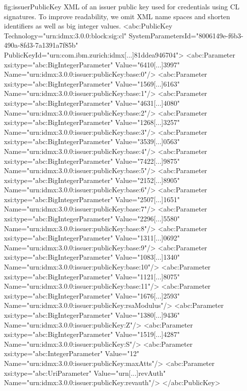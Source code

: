 \begin{xml}
{fig:issuerPublicKey}
{XML of an issuer public key used for credentials using CL signatures. To improve readability, we omit 
XML name spaces and shorten identifiers as well as big integer values.}
<abc:PublicKey 
    Technology="urn:idmx:3.0.0:block:sig:cl" 
    SystemParametersId="8006149e-f6b3-490a-8fd3-7a1391a7f85b" 
    PublicKeyId="urn:com.ibm.zurich:idmx[...]81ddea946704">
  <abc:Parameter xsi:type="abc:BigIntegerParameter" Value="6410[...]3997" 
    Name="urn:idmx:3.0.0:issuer:publicKey:base:0"/>
  <abc:Parameter xsi:type="abc:BigIntegerParameter" Value="1569[...]6163" 
    Name="urn:idmx:3.0.0:issuer:publicKey:base:1"/>
  <abc:Parameter xsi:type="abc:BigIntegerParameter" Value="4631[...]4080" 
    Name="urn:idmx:3.0.0:issuer:publicKey:base:2"/>
  <abc:Parameter xsi:type="abc:BigIntegerParameter" Value="1268[...]3257" 
    Name="urn:idmx:3.0.0:issuer:publicKey:base:3"/>
  <abc:Parameter xsi:type="abc:BigIntegerParameter" Value="3539[...]0563" 
    Name="urn:idmx:3.0.0:issuer:publicKey:base:4"/>
  <abc:Parameter xsi:type="abc:BigIntegerParameter" Value="7422[...]9875" 
    Name="urn:idmx:3.0.0:issuer:publicKey:base:5"/>
  <abc:Parameter xsi:type="abc:BigIntegerParameter" Value="2152[...]8905" 
    Name="urn:idmx:3.0.0:issuer:publicKey:base:6"/>
  <abc:Parameter xsi:type="abc:BigIntegerParameter" Value="2507[...]1651" 
    Name="urn:idmx:3.0.0:issuer:publicKey:base:7"/>
  <abc:Parameter xsi:type="abc:BigIntegerParameter" Value="2296[...]5580" 
    Name="urn:idmx:3.0.0:issuer:publicKey:base:8"/>
  <abc:Parameter xsi:type="abc:BigIntegerParameter" Value="1311[...]0692" 
    Name="urn:idmx:3.0.0:issuer:publicKey:base:9"/>
  <abc:Parameter xsi:type="abc:BigIntegerParameter" Value="1083[...]1340" 
    Name="urn:idmx:3.0.0:issuer:publicKey:base:10"/>
  <abc:Parameter xsi:type="abc:BigIntegerParameter" Value="1121[...]8075"  
    Name="urn:idmx:3.0.0:issuer:publicKey:base:11"/>
  <abc:Parameter xsi:type="abc:BigIntegerParameter" Value="1676[...]2593"
    Name="urn:idmx:3.0.0:issuer:publicKey:rsaModulus"/>
  <abc:Parameter xsi:type="abc:BigIntegerParameter" Value="1380[...]9436"  
    Name="urn:idmx:3.0.0:issuer:publicKey:Z"/>
  <abc:Parameter xsi:type="abc:BigIntegerParameter" Value="1519[...]4287" 
    Name="urn:idmx:3.0.0:issuer:publicKey:S"/>
  <abc:Parameter xsi:type="abc:IntegerParameter" Value="12" 
    Name="urn:idmx:3.0.0:issuer:publicKey:maxAtts"/>
  <abc:Parameter xsi:type="abc:UriParameter" Value="urn[...]revAuth" 
    Name="urn:idmx:3.0.0:issuer:publicKey:revauth"/>
</abc:PublicKey>
\end{xml}


